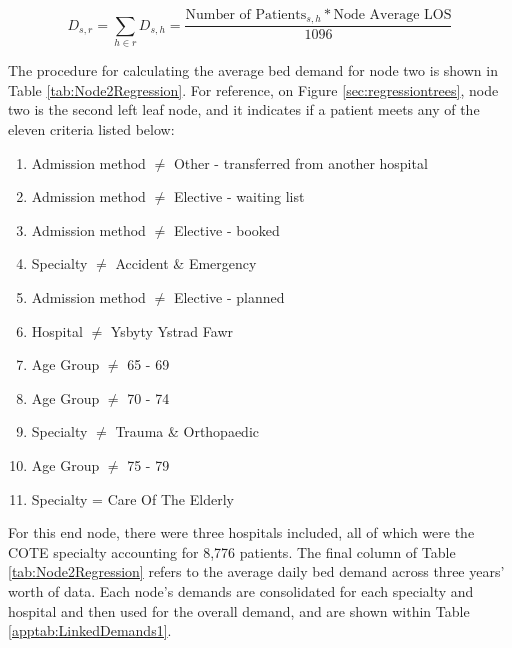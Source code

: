 \documentclass[../thesis.tex]{subfiles}
\begin{document}
\begin{equation}\label{eq:treedemand1}
        D_{s,r} = \sum\limits_{h \in r} D_{s,h} = \frac{\text{Number of Patients}_{s,h}*\text{Node Average LOS}}{1096}
\end{equation}

The procedure for calculating the average bed demand for node two is shown in Table \ref{tab:Node2Regression}. For reference, on Figure \ref{sec:regressiontrees}, node two is the second left leaf node, and it indicates if a patient meets any of the eleven criteria listed below:
\begin{enumerate}
    \item Admission method $\neq$ Other - transferred from another hospital
    \item Admission method $\neq$ Elective - waiting list
    \item Admission method $\neq$ Elective - booked
    \item Specialty $\neq$ Accident \& Emergency
    \item Admission method $\neq$ Elective - planned
    \item Hospital $\neq$ Ysbyty Ystrad Fawr
    \item Age Group $\neq$ 65 - 69
    \item Age Group $\neq$ 70 - 74
    \item Specialty $\neq$ Trauma \& Orthopaedic
    \item Age Group $\neq$ 75 - 79
    \item Specialty = Care Of The Elderly
\end{enumerate}

For this end node, there were three hospitals included, all of which were the COTE specialty accounting for 8,776 patients. The final column of Table \ref{tab:Node2Regression} refers to the average daily bed demand across three years' worth of data. Each node's demands are consolidated for each specialty and hospital and then used for the overall demand, and are shown within Table \ref{apptab:LinkedDemands1}.
\begin{table}[h!]
    \centering{}
    \caption{Regression Tree Node Two - Average LOS}
    \label{tab:Node2Regression}
\end{table}
\end{document}
